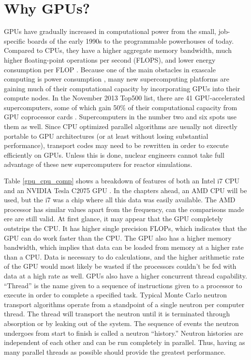 \section{Why GPUs?}

GPUs have gradually increased in computational power from the small, job-specific boards of the early 1990s to the programmable powerhouses of today.  Compared to CPUs, they have a higher aggregate memory bandwidth, much higher floating-point operations per second (FLOPS), and lower energy consumption per FLOP \cite{cuda}.  Because one of the main obstacles in exascale computing is power consumption \cite{exascale}, many new supercomputing platforms are gaining much of their computational capacity by incorporating GPUs into their compute nodes.  In the November 2013 Top500 list, there are 41 GPU-accelerated supercomputers, some of which gain 50\% of their computational capacity from GPU coprocessor cards \cite{top500}.  Supercomputers in the number two and six spots use them as well.  Since CPU optimized parallel algorithms are usually not directly portable to GPU architectures (or at least without losing substantial performance), transport codes may need to be rewritten in order to execute efficiently on GPUs.  Unless this is done, nuclear engineers cannot take full advantage of these new supercomputers for reactor simulations.

Table \ref{gpu_cpu_comp} shows a breakdown of features of both an Intel i7 CPU and an NVIDIA Tesla C2075 GPU \cite{cent, cpu_latency}.  In the chapters ahead, an AMD CPU will be used, but the i7 was a chip where all this data was easily available.  The AMD processor has similar values apart from the frequency, can the comparisons made ere are still valid.  At first glance, it may appear that the GPU completely outstrips the CPU.  It has higher single precision FLOPs, which indicates that the GPU can do work faster than the CPU.  The GPU also has a higher memory bandwidth, which implies that data can be loaded from memory at a higher rate than a CPU.  Data is necessary to do calculations, and the higher arithmetic rate of the GPU would most likely be wasted if the processors couldn't be fed with data at a high rate as well.  GPUs also have a higher concurrent thread capability.  ``Thread'' is the name given to a sequence of instructions given to a processor to execute in order to complete a specified task.  Typical Monte Carlo neutron transport algorithms operate from a standpoint of a single neutron per computer thread.  The thread will transport the neutron until it is terminated through absorption or by leaking out of the system.  The sequence of events the neutron undergoes from start to finish is called a neutron ``history.''  Neutron histories are independent of each other and can be run completely in parallel.  Thus, having as many parallel threads as possible should provide the greatest performance.  

